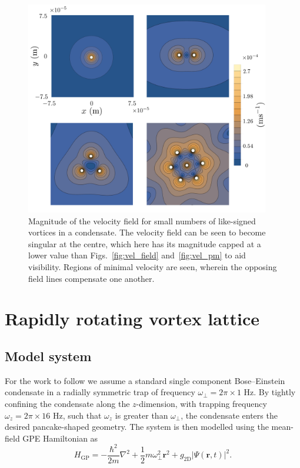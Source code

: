 \begin{figure}\centering
    \includegraphics[width=0.95\textwidth]{Images/ch4_vtx/velocity/vel.png}
    \caption{Magnitude of the velocity field for small numbers of like-signed vortices in a condensate. The velocity field can be seen to become singular at the centre, which here has its magnitude capped at a lower value than Figs.~\ref{fig:vel_field} and~\ref{fig:vel_pm} to aid visibility. Regions of minimal velocity are seen, wherein the opposing field lines compensate one another.}
    \label{fig:vel_pm_contour}
\end{figure}


\section{Rapidly rotating vortex lattice}

\subsection{Model system}\label{sec:modelsystem}
For the work to follow we assume a standard single component Bose--Einstein condensate in a radially symmetric trap of frequency $\omega_\perp = 2\pi \times 1$ Hz. By tightly confining the condensate along the $z$-dimension, with trapping frequency $\omega_z = 2\pi\times 16$ Hz, such that $\omega_z $ is greater than $ \omega_\perp$, the condensate enters the desired pancake-shaped geometry. The system is then modelled using the mean-field GPE Hamiltonian as
\begin{equation}\label{eqn:gpe_h0}
	H_{\mathrm{GP}} = -\frac{\hbar^2}{2m}\nabla^2 + \frac{1}{2}m\omega_{\perp}^2\mathbf{r}^2 + g_{\textrm{2D}}\vert\Psi(\mathbf{r},t)\vert^2.
\end{equation}

